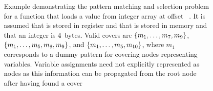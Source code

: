 \begin{figure}
  \centering%
                {%
                  \begin{lstpage}{2.6cm}%
                  \end{lstpage}%
                }%
  \hfill%
  \hfill%

  \caption[Example of the pattern matching and selection problem]%
          {%
            Example demonstrating the pattern matching and selection problem for
            a function that loads a value from integer array  at
            offset \mbox{ \irCode*{\irAddText{}} }.
            It is assumed that  is
            stored in register and that  is stored in memory and that
            an integer is \num{4}~bytes.
            Valid covers are \mbox{$\mSet{m_1, \ldots, m_7, m_9}$},
            \mbox{$\mSet{m_1, \ldots, m_5, m_8, m_9}$}, and
            \mbox{$\mSet{m_1, \ldots, m_5, m_{10}}$}, where $m_1$ corresponds to
            a dummy pattern for covering nodes representing variables.
            Variable assignments need not explicitly represented as nodes as
            this information can be propagated from the root node after having
            found a cover%
          }
\end{figure}

